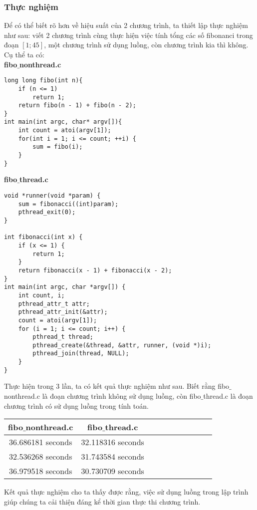 \documentclass{article}
\begin{document}
\subsubsection{Thực nghiệm}
Để có thể biết rõ hơn về hiệu suất của 2 chương trình, ta thiết lập thực nghiệm như sau: viết 2 chương trình cùng thực hiện việc tính tổng các số fibonanci trong đoạn $\left[1;45\right]$, một chương trình sử dụng luồng, còn chương trình kia thì không. Cụ thể ta có:\\
\textbf{fibo$\_$nonthread.c}
\begin{verbatim}
long long fibo(int n){
    if (n <= 1)
        return 1;
    return fibo(n - 1) + fibo(n - 2);        
}
int main(int argc, char* argv[]){
    int count = atoi(argv[1]);
    for(int i = 1; i <= count; ++i) {
        sum = fibo(i);
    }
}
\end{verbatim}
\textbf{fibo$\_$thread.c}
\begin{verbatim}
void *runner(void *param) {
	sum = fibonacci((int)param);
	pthread_exit(0);
}

int fibonacci(int x) {
	if (x <= 1) {
		return 1;
	}
	return fibonacci(x - 1) + fibonacci(x - 2);
}
int main(int argc, char *argv[]) {
	int count, i;
	pthread_attr_t attr;
	pthread_attr_init(&attr);
	count = atoi(argv[1]);
	for (i = 1; i <= count; i++) {
		pthread_t thread;
		pthread_create(&thread, &attr, runner, (void *)i);
		pthread_join(thread, NULL);
	}
}
\end{verbatim}
Thực hiện trong 3 lần, ta có kết quả thực nghiệm như sau. Biết rằng fibo$\_$nonthread.c là đoạn chương trình không sử dụng luồng, còn fibo$\_$thread.c là đoạn chương trình có sử dụng luồng trong tính toán.
\begin{center}
        \begin{tabular}{|c|c| c|c| c|c| c|c| c|c|}
        \hline
            fibo$\_$nonthread.c & fibo$\_$thread.c\\
            \hline
            36.686181 seconds & 32.118316 seconds\\
            32.536268 seconds & 31.743584 seconds\\
            36.979518 seconds & 30.730709 seconds\\
            \hline
        \end{tabular}
    \end{center}
Kết quả thực nghiệm cho ta thấy được rằng, việc sử dụng luồng trong lập trình giúp chúng ta cải thiện đáng kể thời gian thực thi chương trình.
\newpage
\medskip

\end{document}
